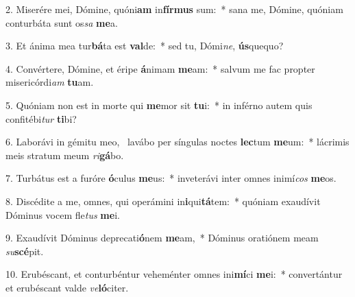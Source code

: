 2. Miserére mei, Dómine, quóni\textbf{am} in\textbf{fír}\textbf{mus} sum:~*  sana me, Dómine, quóniam conturbáta sunt os\textit{sa} \textbf{me}a.\

3. Et ánima mea tur\textbf{bá}ta est \textbf{val}de:~*  sed tu, Dómi\textit{ne}, \textbf{ús}quequo?\

4. Convértere, Dómine, et éripe \textbf{á}nimam \textbf{me}am:~*  salvum me fac propter misericórdi\textit{am} \textbf{tu}am.\

5. Quóniam non est in morte qui \textbf{me}mor sit \textbf{tu}i:~*  in inférno autem quis confitébi\textit{tur} \textbf{ti}bi?\

6. Laborávi in gémitu meo, \dag\  lavábo per síngulas noctes \textbf{lec}tum \textbf{me}um:~*  lácrimis meis stratum meum \textit{ri}\textbf{gá}bo.\

7. Turbátus est a furóre \textbf{ó}culus \textbf{me}us:~*  inveterávi inter omnes inimí\textit{cos} \textbf{me}os.\

8. Discédite a me, omnes, qui operámini in\textbf{i}qui\textbf{tá}tem:~*  quóniam exaudívit Dóminus vocem fle\textit{tus} \textbf{me}i.\

9. Exaudívit Dóminus deprecati\textbf{ó}nem \textbf{me}am,~*  Dóminus oratiónem meam \textit{su}\textbf{scé}pit.\

10. Erubéscant, et conturbéntur veheménter omnes ini\textbf{mí}ci \textbf{me}i:~*  convertántur et erubéscant valde \textit{ve}\textbf{ló}citer.\

